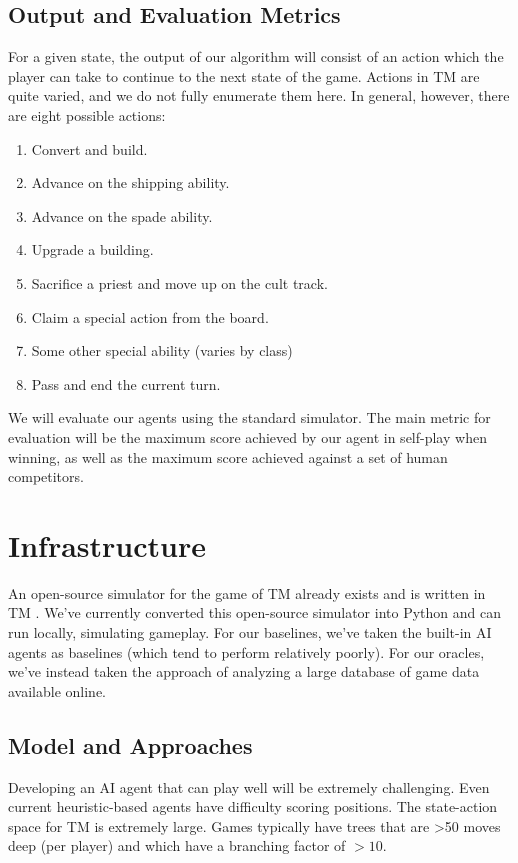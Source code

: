 \documentclass[10pt,twocolumn,letterpaper]{article}
\begin{document}
\subsection{Output and Evaluation Metrics}
For a given state, the output of our algorithm will consist of an action which the player can take to continue to the next state of the game. Actions in TM are quite varied, and we do not fully enumerate them here. In general, however, there are eight possible actions:
\begin{enumerate}
    \item Convert and build.
    \item Advance on the shipping ability.
    \item Advance on the spade ability.
    \item Upgrade a building.
    \item Sacrifice a priest and move up on the cult track.
    \item Claim a special action from the board.
    \item Some other special ability (varies by class)
    \item Pass and end the current turn.
\end{enumerate}

We will evaluate our agents using the standard simulator. The main metric for evaluation will be the maximum score achieved by our agent in self-play when winning, as well as the maximum score achieved against a set of human competitors.

\section{Infrastructure}
An open-source simulator for the game of TM already exists and is written in TM \cite{infra}. We've currently converted this open-source simulator into Python and can run locally, simulating gameplay. For our baselines, we've taken the built-in AI agents as baselines (which tend to perform relatively poorly). For our oracles, we've instead taken the approach of analyzing a large database of game data available online.

\subsection{Model and Approaches}
Developing an AI agent that can play well will be extremely challenging. Even current heuristic-based agents have difficulty scoring positions. The state-action space for TM is extremely large. Games typically have trees that are >50 moves deep (per player) and which have a branching factor of $>10$. 
\end{document}
